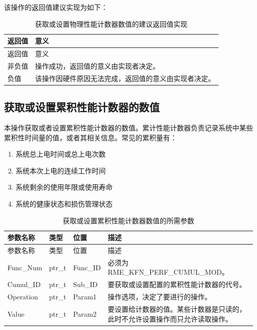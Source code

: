 该操作的返回值建议实现为如下：

\begin{xltabular}{\textwidth}{@{}>{\hsize\raggedright\arraybackslash}X>{\hsize\raggedright\arraybackslash}X@{}}
\caption{获取或设置物理性能计数器数值的建议返回值实现}\label{tab:8-69-get-or-set-physical-performance-counter-suggested-return-values}\\
\toprule
返回值 & 意义\tabularnewline
\endfirsthead
\toprule
返回值 & 意义\tabularnewline
\midrule
\endhead
\bottomrule
\endlastfoot
    非负值 & 操作成功，返回值的意义由实现者决定。\tabularnewline
    负值 & 该操作因硬件原因无法完成，返回值的意义由实现者决定。\tabularnewline
\end{xltabular}

\subsection{获取或设置累积性能计数器的数值}\label{subsec:8-get-or-set-cumulative-performance-counter}

本操作获取或者设置累积性能计数器的数值。累计性能计数器负责记录系统中某些累积性时间量的值，或者其相关信息。常见的累积量有：

\begin{enumerate}
\def\labelenumi{\arabic{enumi}.}
\item
  系统总上电时间或总上电次数
\item
  系统本次上电的连续工作时间
\item
  系统剩余的使用年限或使用寿命
\item
  系统的健康状态和损伤管理状态
\end{enumerate}

\begin{xltabular}{\textwidth}{@{}>{\hsize\raggedright\arraybackslash}X>{\hsize\raggedright\arraybackslash}X>{\hsize\raggedright\arraybackslash}X>{\hsize\raggedright\arraybackslash}X@{}}
\caption{获取或设置累积性能计数器数值的所需参数}\label{tab:8-70-get-or-set-cumulative-performance-counter-parameters}\\
\toprule
参数名称 & 类型 & 位置 & 描述\tabularnewline
\endfirsthead
\toprule
参数名称 & 类型 & 位置 & 描述\tabularnewline
\midrule
\endhead
\bottomrule
\endlastfoot
Func\_Num & ptr\_t & Func\_ID & 必须为 RME\_KFN\_PERF\_CUMUL\_MOD。\tabularnewline
Cumul\_ID & ptr\_t & Sub\_ID &
要获取或设置配置的累积性能计数器的代号。\tabularnewline
Operation & ptr\_t & Param1 &
操作选项，决定了要进行的操作。\tabularnewline
Value & ptr\_t & Param2 &
要设置给计数器的值。某些计数器是只读的，此时不允许设置操作而只允许读取操作。\tabularnewline
\end{xltabular}

